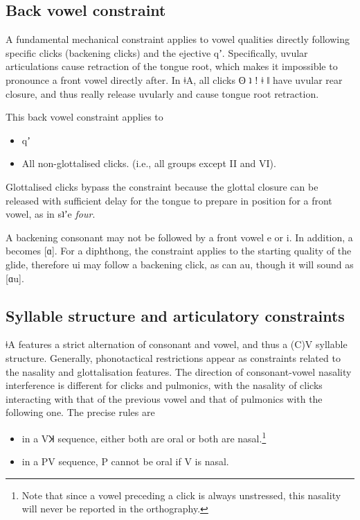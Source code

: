 \documentclass[11pt,a5paper]{book}
\newcommand{\qcn}[1]{\textcolor{AccentText}{\large#1}}
\newcommand{\langname}{\qcn{ǂA}}
\newcommand{\transl}[2]{\qcn{#1} \emph{#2}}
\begin{document}
\subsection{Back vowel constraint}\label{sec:backvowelconstraint}

A fundamental mechanical constraint applies to vowel qualities directly following specific clicks (backening clicks) and the ejective \qcn{qʼ}. Specifically, uvular articulations cause retraction of the tongue root, which makes it impossible to pronounce a front vowel directly after. In \langname, all clicks \qcn{ʘ ʇ ǃ ǂ ǁ} have uvular rear closure, and thus really release uvularly and cause tongue root retraction.

This back vowel constraint applies to

\begin{itemize}
	\item \qcn{qʼ}
	\item All non-glottalised clicks. (i.e., all groups except II and VI).
\end{itemize}

Glottalised clicks bypass the constraint because the glottal closure can be released with sufficient delay for the tongue to prepare in position for a front vowel, as in \transl{sʇʼe}{four}.

A backening consonant may not be followed by a front vowel \qcn{e} or \qcn{i}. In addition, \qcn{a} becomes [ɑ].  For a diphthong, the constraint applies to the starting quality of the glide, therefore \qcn{ui} may follow a backening click, as can \qcn{au}, though it will sound as [ɑu].

\subsection{Syllable structure and articulatory constraints}\label{sec:syllables}

\langname{} features a strict alternation of consonant and vowel, and thus a (C)V syllable structure. Generally, phonotactical restrictions appear as constraints related to the nasality and glottalisation features. The direction of consonant-vowel nasality interference is different for clicks and pulmonics, with the nasality of clicks interacting with that of the previous vowel and that of pulmonics with the following one. The precise rules are

\begin{itemize}
	\item in a VꞰ sequence, either both are oral or both are nasal.\footnote{Note that since a vowel preceding a click is always unstressed, this nasality will never be reported in the orthography.}
	\item in a PV sequence, P cannot be oral if V is nasal.
\end{itemize}
\end{document}
